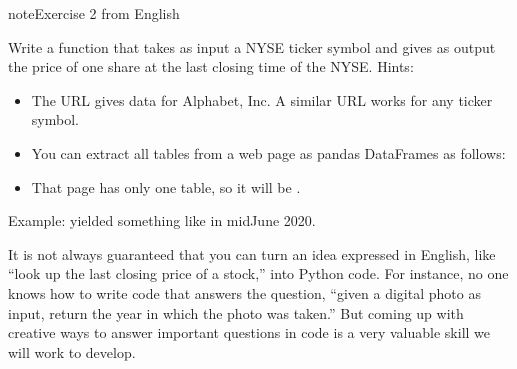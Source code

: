 \documentclass[letterpaper,10pt,english]{sphinxmanual}
\begin{document}
\begin{sphinxadmonition}{note}{Exercise 2 \sphinxhyphen{} from English}

Write a function  that takes as input a NYSE ticker symbol and gives as output the price of one share at the last closing time of the NYSE.  Hints:
\begin{itemize}
\item {} 
The URL  gives data for Alphabet, Inc.  A similar URL works for any ticker symbol.

\item {} 
You can extract all tables from a web page as pandas DataFrames as follows:

\end{itemize}

\begin{sphinxVerbatim}[commandchars=\\\{\}]
    
\end{sphinxVerbatim}
\begin{itemize}
\item {} 
That page has only one table, so it will be .

\end{itemize}

Example:  yielded something like  in mid\sphinxhyphen{}June 2020.
\end{sphinxadmonition}

It is not always guaranteed that you can turn an idea expressed in English, like “look up the last closing price of a stock,” into Python code.  For instance, no one knows how to write code that answers the question, “given a digital photo as input, return the year in which the photo was taken.”  But coming up with creative ways to answer important questions in code is a very valuable skill we will work to develop.
\end{document}
